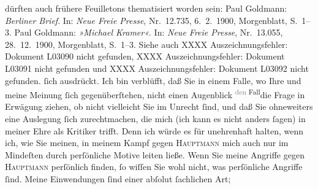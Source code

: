 {{{                  dürften auch frühere Feuilletons thematisiert worden sein: Paul Goldmann: \emph{Berliner Brief}. In: \emph{Neue Freie Presse}, Nr. 12.735, 6. 2. 1900, Morgenblatt, S. 1–3. Paul Goldmann: \emph{»Michael Kramer«}. In: \emph{Neue Freie Presse}, Nr. 13.055, 28. 12. 1900, Morgenblatt, S. 1–3. Siehe auch XXXX Auszeichnungsfehler: Dokument L03090 nicht gefunden, XXXX Auszeichnungsfehler: Dokument L03091 nicht gefunden und XXXX Auszeichnungsfehler: Dokument L03092 nicht gefunden.}}}\label{K_L03535-2}{ }ſich {\pb}ausdrückt. Ich bin verblüfft, daß Sie in einem
               Falle, wo Ihre und meine Meinung{ }ſich gegenüberſtehen, nicht einen Augenblick \substVorne{}\textsuperscript{\textcolor{gray}{den} Fall}\substDazwischen{}die Frage\substHinten{} in Erwägung ziehen, ob nicht vielleicht Sie im Unrecht{ }ſind, und daß Sie
               ohneweiters eine Auslegung{ }ſich zurechtmachen, die mich (ich kann es nicht anders{ }ſagen) in meiner  Ehre als Kritiker trifft. Denn ich würde es für
               unehrenhaft halten, wenn ich, wie Sie meinen, in meinem Kampf gegen \textsc{Hauptmann} mich auch nur im Mindeſten durch perſönliche Motive leiten ließe. Wenn Sie
               meine Angriffe gegen \textsc{Hauptmann} perſönlich {\pb}finden,{ }ſo wiſſen Sie wohl nicht,
               was perſönliche Angriffe{ }ſind. Meine Einwendungen{ }ſind einer abſolut{ }ſachlichen Art;

